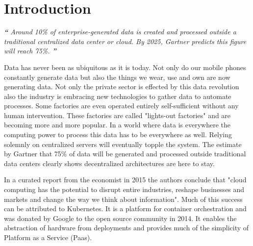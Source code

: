 \section{Introduction}
\begin{displayquote}
\textit{\textbf{\Huge{``}}
\large{Around 10\% of enterprise-generated data is created and processed outside a traditional centralized data center or cloud. By 2025, Gartner predicts this figure will reach 75\%.\cite{gartnerEdgeComputing:online}}
\textbf{\Huge{''}}}
\\[1pt]
\end{displayquote}
Data has never been as ubiquitous as it is today. Not only do our mobile phones constantly generate data but also the things we wear, use and own are now generating data. Not only the private sector is effected by this data revolution also the industry is embracing new technologies to gather data to automate processes. Some factories are even operated entirely self-sufficient without any human intervention. These factories are called "lights-out factories" and are becoming more and more popular\cite{wheresmyRobotLightsOut33:online}. In a world where data is everywhere the computing power to process this data has to be everywhere as well. Relying solemnly on centralized servers will eventually topple the system. The estimate by Gartner that 75\% of data will be generated and processed outside traditional data centers clearly shows decentralized architectures are here to stay\cite{gartnerEdgeComputing:online}.

In a curated report from the economist in 2015 the authors conclude that "cloud computing has the potential to disrupt entire industries, reshape businesses and markets and change the way we think about information"\cite{PuttogetEconomistCloud13:online}. Much of this success can be attributed to Kubernetes. It is a platform for container orchestration and was donated by Google to the open source community in 2014\cite{WhatisKubernetes87:online}. It enables the abstraction of hardware from deployments and provides much of the simplicity of Platform as a Service (Paas)\cite{WhatisKubernetes87:online}.

